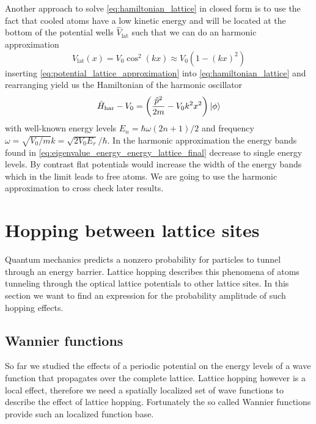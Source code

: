 Another approach to solve \cref{eq:hamiltonian_lattice} in closed form is to
use the fact that cooled atoms have a low kinetic energy and will be located
at the bottom of the potential wells $\hat{V}_\text{lat}$ such that we can
do an harmonic approximation
\begin{equation}
  V_\text{lat}(x)
  =V_0\cos^2(kx)
  \approx V_0\left(1-(kx)^2\right)
  \label{eq:potential_lattice_approximation}
\end{equation}
inserting \cref{eq:potential_lattice_approximation} into
\cref{eq:hamiltonian_lattice} and rearranging yield us the Hamiltonian of
the harmonic oscillator
\begin{equation}
  \hat{H}_\text{har}-V_0
  =\left(\frac{\hat{p}^2}{2m}-V_0k^2x^2\right)\ket{\phi}
  \label{eq:hamiltonian_harmonic}
\end{equation}
with well-known energy levels $E_n=\hbar\omega(2n+1)/2$ and frequency
$\omega=\sqrt{V_0/m}k=\sqrt{2V_0E_r}/\hbar$. In the harmonic approximation
the energy bands found in \cref{eq:eigenvalue_energy_energy_lattice_final}
decrease to single energy levels. By contrast flat potentials would increase
the width of the energy bands which in the limit leads to free atoms. We are
going to use the harmonic approximation to cross check later results.

\section{Hopping between lattice sites}

Quantum mechanics predicts a nonzero probability for particles to tunnel
through an energy barrier. Lattice hopping describes this phenomena of atoms
tunneling through the optical lattice potentials to other lattice sites. In
this section we want to find an expression for the probability amplitude of
such hopping effects.

\subsection{Wannier functions}

So far we studied the effects of a periodic potential on the energy levels of
a wave function that propagates over the complete lattice. Lattice hopping
however is a local effect, therefore we need a spatially localized set of
wave functions to describe the effect of lattice hopping. Fortunately the
so called Wannier functions provide such an localized function base.

